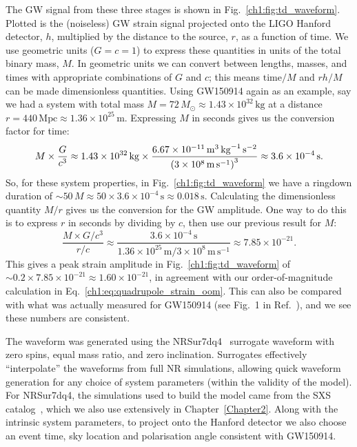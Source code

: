 The GW signal from these three stages is shown in Fig.~\ref{ch1:fig:td_waveform}.
Plotted is the (noiseless) GW strain signal projected onto the LIGO Hanford detector, $h$, multiplied by the distance to the source, $r$, as a function of time. 
We use geometric units ($G = c = 1$) to express these quantities in units of the total binary mass, $M$. 
In geometric units we can convert between lengths, masses, and times with appropriate combinations of $G$ and $c$; this means $\mathrm{time}/M$ and $rh/M$ can be made dimensionless quantities. 
Using GW150914 again as an example, say we had a system with total mass $M = 72\,M_\odot \approx 1.43 \times 10^{32}\,\mathrm{kg}$ at a distance $r = 440\,\mathrm{Mpc} \approx 1.36 \times 10^{25}\,\mathrm{m}$. 
Expressing $M$ in seconds gives us the conversion factor for time:
\begin{equation}
    M \times \frac{G}{c^3} \approx 1.43 \times 10^{32}\, \mathrm{kg} \times \frac{6.67 \times 10^{-11}\, \mathrm{m}^3\, \mathrm{kg}^{-1}\, \mathrm{s}^{-2}}{\qty(3 \times 10^8\, \mathrm{m}\, \mathrm{s}^{-1})^3} \approx 3.6 \times 10^{-4}\, \mathrm{s}.
\end{equation}
So, for these system properties, in Fig.~\ref{ch1:fig:td_waveform} we have a ringdown duration of $\sim 50\,M \approx 50 \times 3.6 \times 10^{-4}\,\mathrm{s} \approx 0.018\,\mathrm{s}$. 
Calculating the dimensionless quantity $M/r$ gives us the conversion for the GW amplitude. 
One way to do this is to express $r$ in seconds by dividing by $c$, then use our previous result for $M$:
\begin{equation}
    \frac{M \times G/c^3}{r/c} \approx \frac{3.6 \times 10^{-4}\,\mathrm{s}}{1.36 \times 10^{25}\, \mathrm{m}/3 \times 10^8\, \mathrm{m}\, \mathrm{s}^{-1}} \approx 7.85 \times 10^{-21}.
\end{equation}
This gives a peak strain amplitude in Fig.~\ref{ch1:fig:td_waveform} of $\sim 0.2 \times 7.85 \times 10^{-21} \approx 1.60 \times 10^{-21}$, in agreement with our order-of-magnitude calculation in Eq.~\ref{ch1:eq:quadrupole_strain_oom}. 
This can also be compared with what was actually measured for GW150914 (see Fig.~1 in Ref.~\cite{LIGOScientific:2016aoc}), and we see these numbers are consistent.

The waveform was generated using the NRSur7dq4~\cite{Varma:2019csw} surrogate waveform with zero spins, equal mass ratio, and zero inclination. 
Surrogates effectively ``interpolate'' the waveforms from full NR simulations, allowing quick waveform generation for any choice of system parameters (within the validity of the model). 
For NRSur7dq4, the simulations used to build the model came from the SXS catalog~\cite{Boyle:2019kee}, which we also use extensively in Chapter~\ref{Chapter2}. 
Along with the intrinsic system parameters, to project onto the Hanford detector we also choose an event time, sky location and polarisation angle consistent with GW150914.

